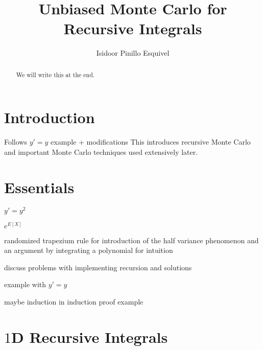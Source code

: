 \documentclass[12pt]{article}
\begin{document}
\title{Unbiased Monte Carlo for Recursive Integrals}
\author{Isidoor Pinillo Esquivel}
\maketitle


\begin{abstract}
    We will write this at the end.
\end{abstract}

\tableofcontents

\section{Introduction}

Follows $y'=y$ example + modifications
This introduces recursive Monte Carlo and important Monte Carlo techniques used extensively later.

\section{Essentials}

\begin{example}
    $y'=y^{2}$
\end{example}

\begin{example}
    $e^{E[X]}$
\end{example}

\begin{example}
    randomized trapezium rule for introduction of the half variance phenomenon and an argument
    by integrating a polynomial for intuition
\end{example}

\begin{technique}
    discuss problems with implementing recursion and solutions
\end{technique}

\begin{example}
    example with $y'=y$
\end{example}

\begin{example}
    maybe induction in induction proof example
\end{example}

\section{$1$D Recursive Integrals}
\end{document}
